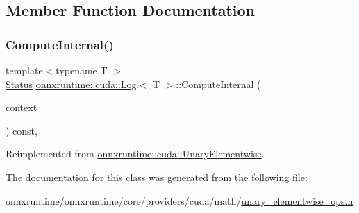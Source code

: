 \subsection{Member Function Documentation}
\mbox{\label{classonnxruntime_1_1cuda_1_1Log_a857314aeb210d599f086e8109e6324d4}} 
\subsubsection{\texorpdfstring{Compute\+Internal()}{ComputeInternal()}}
{\footnotesize\ttfamily template$<$typename T $>$ \\
\mbox{\hyperlink{classonnxruntime_1_1common_1_1Status}{Status}} \mbox{\hyperlink{classonnxruntime_1_1cuda_1_1Log}{onnxruntime\+::cuda\+::\+Log}}$<$ T $>$\+::Compute\+Internal (\begin{DoxyParamCaption}\item[{\mbox{\hyperlink{classonnxruntime_1_1OpKernelContext}{Op\+Kernel\+Context}} $\ast$}]{context }\end{DoxyParamCaption}) const\hspace{0.3cm}{\ttfamily [override]}, {\ttfamily [virtual]}}



Reimplemented from \mbox{\hyperlink{classonnxruntime_1_1cuda_1_1UnaryElementwise_abbbcb29c3937e2ac9e2ad768d9c69fca}{onnxruntime\+::cuda\+::\+Unary\+Elementwise}}.



The documentation for this class was generated from the following file\+:\begin{DoxyCompactItemize}
\item 
onnxruntime/onnxruntime/core/providers/cuda/math/\mbox{\hyperlink{unary__elementwise__ops_8h}{unary\+\_\+elementwise\+\_\+ops.\+h}}\end{DoxyCompactItemize}
